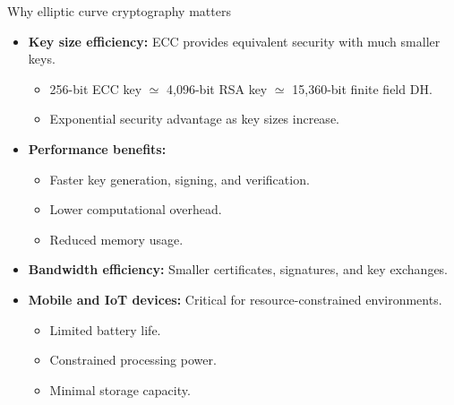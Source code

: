\documentclass[aspectratio=169, lualatex, handout]{beamer}
\begin{document}
\begin{frame}{Why elliptic curve cryptography matters}
	\begin{itemize}[<+->]
		\item \textbf{Key size efficiency:} ECC provides equivalent security with much smaller keys.
		      \begin{itemize}
			      \item 256-bit ECC key $\simeq$ 4,096-bit RSA key $\simeq$ 15,360-bit finite field DH.
			      \item Exponential security advantage as key sizes increase.
		      \end{itemize}
		\item \textbf{Performance benefits:}
		      \begin{itemize}
			      \item Faster key generation, signing, and verification.
			      \item Lower computational overhead.
			      \item Reduced memory usage.
		      \end{itemize}
		\item \textbf{Bandwidth efficiency:} Smaller certificates, signatures, and key exchanges.
		\item \textbf{Mobile and IoT devices:} Critical for resource-constrained environments.
		      \begin{itemize}
			      \item Limited battery life.
			      \item Constrained processing power.
			      \item Minimal storage capacity.
		      \end{itemize}
	\end{itemize}
\end{frame}
\end{document}
